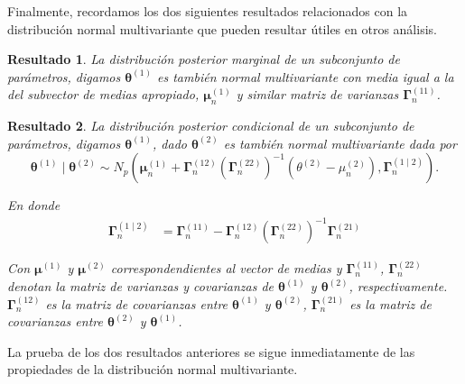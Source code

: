 \documentclass[
  10pt,
  spanish,
]{book}
\newtheorem{proposition}{Resultado}[chapter]
\theoremstyle{definition}
\theoremstyle{definition}
\theoremstyle{definition}
\theoremstyle{definition}
\theoremstyle{remark}
\begin{document}
Finalmente, recordamos los dos siguientes resultados relacionados con la distribución normal multivariante que pueden resultar útiles en otros análisis.

\begin{proposition}
\protect\hypertarget{prp:unnamed-chunk-34}{}{\label{prp:unnamed-chunk-34} }La distribución posterior marginal de un subconjunto de parámetros, digamos \(\boldsymbol \theta^{(1)}\) es también normal multivariante con media igual a la del subvector de medias apropiado, \(\boldsymbol \mu_n^{(1)}\) y similar matriz de varianzas \(\boldsymbol \Gamma_n^{(11)}\).
\end{proposition}

\begin{proposition}
\protect\hypertarget{prp:unnamed-chunk-35}{}{\label{prp:unnamed-chunk-35} }La distribución posterior condicional de un subconjunto de parámetros, digamos \(\boldsymbol \theta^{(1)}\), dado \(\boldsymbol \theta^{(2)}\) es también normal multivariante dada por
\begin{equation*}
  \boldsymbol \theta^{(1)} \mid \boldsymbol \theta^{(2)} \sim N_p \left(\boldsymbol \mu_n^{(1)}+\boldsymbol \Gamma_n^{(12)}\left(\boldsymbol \Gamma_n^{(22)}\right)^{-1}
  \left(\theta^{(2)}-\mu_n^{(2)}\right),\boldsymbol \Gamma_n^{(1 \mid 2)}\right).
\end{equation*}

En donde
\begin{align}
  \boldsymbol \Gamma_n^{(1 \mid 2)}&= \boldsymbol \Gamma_n^{(11)}-\boldsymbol \Gamma_n^{(12)}\left(\boldsymbol \Gamma_n^{(22)}\right)^{-1}\boldsymbol \Gamma_n^{(21)}
\end{align}

Con \(\boldsymbol \mu^{(1)}\) y \(\boldsymbol \mu^{(2)}\) correspondendientes al vector de medias y \(\boldsymbol \Gamma_n^{(11)}\), \(\boldsymbol \Gamma_n^{(22)}\) denotan la matriz de varianzas y covarianzas de \(\boldsymbol \theta^{(1)}\) y \(\boldsymbol \theta^{(2)}\), respectivamente. \(\boldsymbol \Gamma_n^{(12)}\) es la matriz de covarianzas entre \(\boldsymbol \theta^{(1)}\) y \(\boldsymbol \theta^{(2)}\), \(\boldsymbol \Gamma_n^{(21)}\) es la matriz de covarianzas entre \(\boldsymbol \theta^{(2)}\) y \(\boldsymbol \theta^{(1)}\).
\end{proposition}

La prueba de los dos resultados anteriores se sigue inmediatamente de las propiedades de la distribución normal multivariante.

\hypertarget{appendix-apuxe9ndice}{%
\appendix}
\end{document}
